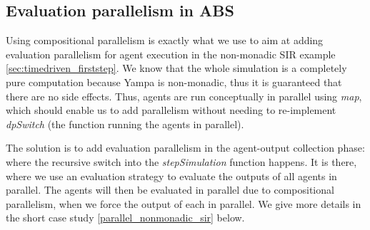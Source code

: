 \subsection{Evaluation parallelism in ABS}
Using compositional parallelism is exactly what we use to aim at adding evaluation parallelism for agent execution in the non-monadic SIR example \ref{sec:timedriven_firststep}. We know that the whole simulation is a completely pure computation because Yampa is non-monadic, thus it is guaranteed that there are no side effects. Thus, agents are run conceptually in parallel using \textit{map}, which should enable us to add parallelism without needing to re-implement \textit{dpSwitch} (the function running the agents in parallel). %

The solution is to add evaluation parallelism in the agent-output collection phase: where the recursive switch into the \textit{stepSimulation} function happens. It is there, where we use an evaluation strategy to evaluate the outputs of all agents in parallel. The agents will then be evaluated in parallel due to compositional parallelism, when we force the output of each in parallel. We give more details in the short case study \ref{parallel_nonmonadic_sir} below.